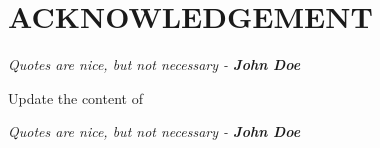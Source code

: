 \section*{ACKNOWLEDGEMENT}
\begin{center}
	\textit{Quotes are nice, but not necessary - \textbf{John Doe}}
\end{center}

Update the content of 

\begin{center}
	\textit{Quotes are nice, but not necessary - \textbf{John Doe}}
\end{center}
